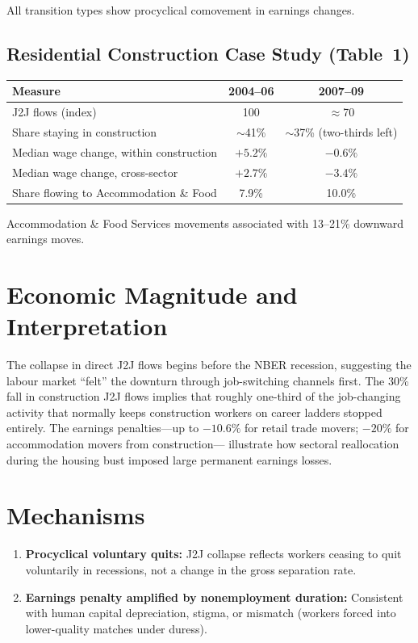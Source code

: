 All transition types show procyclical comovement in earnings changes.

\subsection*{Residential Construction Case Study (Table~1)}

\begin{center}
\small
\begin{tabular}{lcc}
\toprule
\textbf{Measure} & \textbf{2004--06} & \textbf{2007--09} \\
\midrule
J2J flows (index) & 100 & $\approx$70 \\
Share staying in construction & $\sim$41\% & $\sim$37\% (two-thirds left) \\
Median wage change, within construction & $+5.2\%$ & $-0.6\%$ \\
Median wage change, cross-sector & $+2.7\%$ & $-3.4\%$ \\
Share flowing to Accommodation \& Food & 7.9\% & 10.0\% \\
\bottomrule
\end{tabular}
\end{center}

Accommodation \& Food Services movements associated with 13--21\% downward
earnings moves.

\section{Economic Magnitude and Interpretation}

The collapse in direct J2J flows begins before the NBER recession, suggesting
the labour market ``felt'' the downturn through job-switching channels first.
The 30\% fall in construction J2J flows implies that roughly one-third of the
job-changing activity that normally keeps construction workers on career
ladders stopped entirely. The earnings penalties---up to $-10.6\%$ for
retail trade movers; $-20\%$ for accommodation movers from construction---
illustrate how sectoral reallocation during the housing bust imposed large
permanent earnings losses.

\section{Mechanisms}

\begin{enumerate}
  \item \textbf{Procyclical voluntary quits:} J2J collapse reflects workers
    ceasing to quit voluntarily in recessions, not a change in the gross
    separation rate.
  \item \textbf{Earnings penalty amplified by nonemployment duration:}
    Consistent with human capital depreciation, stigma, or mismatch (workers
    forced into lower-quality matches under duress).
\end{enumerate}

